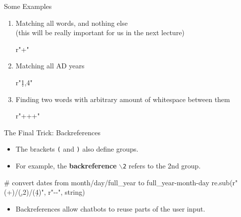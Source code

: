 \documentclass[professionalfonts, xcolor={usenames,svgnames,x11names,table}]{beamer}
\begin{document}
\begin{frame}[fragile]{Some Examples}
\begin{enumerate}
    \item Matching all words, and nothing else\\
        (this will be really important for us in the next lecture)
\begin{pythoncode}
    r"\w+"
\end{pythoncode}
    \item Matching all AD years
\begin{pythoncode}
    r"\d{1,4}"
\end{pythoncode}
    \item Finding two words with arbitrary amount of whitespace between them
\begin{pythoncode}
    r"\w+\s+\w+"
\end{pythoncode}
\end{enumerate}
\end{frame}

\begin{frame}[fragile]{The Final Trick: Backreferences}
    \begin{itemize}
        \item The brackets \texttt{(} and \texttt{)} also define groups.
        \item For example, the \textbf{backreference} \texttt{$\backslash$2} refers to the 2nd group.
    \end{itemize}

\begin{pythoncode}
    # convert dates from month/day/full_year to full_year-month-day
    re.sub(r"(\w+)/(\d{,2})/(\d{4})",
           r"\3-\1-\2",
           string)
\end{pythoncode}

    \begin{itemize}
        \item Backreferences allow chatbots to reuse parts of the user input.
    \end{itemize}
\end{frame}
\end{document}
